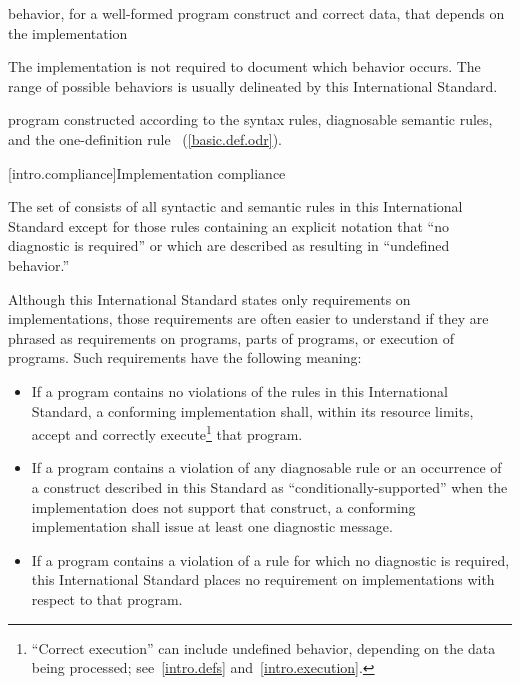 %
behavior, for a well-formed program construct and correct data, that
depends on the implementation\\
\begin{note} The implementation is not required to
document which behavior occurs. The range of
possible behaviors is usually delineated by this International Standard.
\end{note}

%
\Cpp  program constructed according to the syntax rules, diagnosable
semantic rules, and the one-definition rule ~(\ref{basic.def.odr}).%

[intro.compliance]{Implementation compliance}

\pnum
{}%
%
The set of
consists of all syntactic and semantic rules in this International
Standard except for those rules containing an explicit notation that
``no diagnostic is required'' or which are described as resulting in
``undefined behavior.''

\pnum
{}%
Although this International Standard states only requirements on \Cpp
implementations, those requirements are often easier to understand if
they are phrased as requirements on programs, parts of programs, or
execution of programs. Such requirements have the following meaning:
\begin{itemize}

\item
If a program contains no violations of the rules in this
International Standard, a conforming implementation shall,
within its resource limits, accept and correctly execute\footnote{``Correct execution'' can include undefined behavior, depending on
the data being processed; see~\ref{intro.defs} and~\ref{intro.execution}.}
that program.

\item
{}%
If a program contains a violation of any diagnosable rule or an occurrence
of a construct described in this Standard as ``conditionally-supported'' when
the implementation does not support that construct, a conforming implementation
shall issue at least one diagnostic message.

\item
{}%
If a program contains a violation of a rule for which no diagnostic
is required, this International Standard places no requirement on
implementations with respect to that program.

\end{itemize}

